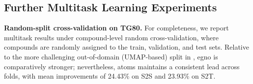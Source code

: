 \subsection{Further Multitask Learning Experiments}

\label{sect:random_split}
\textbf{Random-split cross-validation on TG80.} For completeness, we report multitask results under compound-level random cross-validation, where compounds are randomly assigned to the train, validation, and test sets. Relative to the more challenging out-of-domain (UMAP-based) split in , \gls{egno} is comparatively stronger; nevertheless, \gls{atoms} maintains a consistent lead across folds, with mean improvements of 24.43\% on S2S and 23.93\% on S2T.

\begin{table}[H]
  \centering
  \caption{S2S \gls{mse} \((\times10^{-2})\) on TG80 across five random cluster assignments.}
  \label{tab:tg80_random_s2s}
\end{table}

